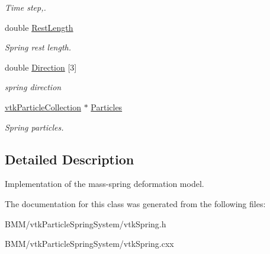 \begin{DoxyCompactItemize}
\begin{DoxyCompactList}\small\item\em Time step,. \item\end{DoxyCompactList}\item 
\hypertarget{classvtkSpring_a6eccb2afbe2e2094ba9103555058b0d5}{
double \hyperlink{classvtkSpring_a6eccb2afbe2e2094ba9103555058b0d5}{RestLength}}
\label{classvtkSpring_a6eccb2afbe2e2094ba9103555058b0d5}

\begin{DoxyCompactList}\small\item\em Spring rest length. \item\end{DoxyCompactList}\item 
\hypertarget{classvtkSpring_a9657e8825c7870a422f7ee4ddcf6addd}{
double \hyperlink{classvtkSpring_a9657e8825c7870a422f7ee4ddcf6addd}{Direction} \mbox{[}3\mbox{]}}
\label{classvtkSpring_a9657e8825c7870a422f7ee4ddcf6addd}

\begin{DoxyCompactList}\small\item\em spring direction \item\end{DoxyCompactList}\item 
\hypertarget{classvtkSpring_a2afa30c11d140f4376c9e1bde4af18b9}{
\hyperlink{classvtkParticleCollection}{vtkParticleCollection} $\ast$ \hyperlink{classvtkSpring_a2afa30c11d140f4376c9e1bde4af18b9}{Particles}}
\label{classvtkSpring_a2afa30c11d140f4376c9e1bde4af18b9}

\begin{DoxyCompactList}\small\item\em Spring particles. \item\end{DoxyCompactList}\end{DoxyCompactItemize}


\subsection{Detailed Description}
Implementation of the mass-\/spring deformation model. 

The documentation for this class was generated from the following files:\begin{DoxyCompactItemize}
\item 
BMM/vtkParticleSpringSystem/vtkSpring.h\item 
BMM/vtkParticleSpringSystem/vtkSpring.cxx\end{DoxyCompactItemize}
